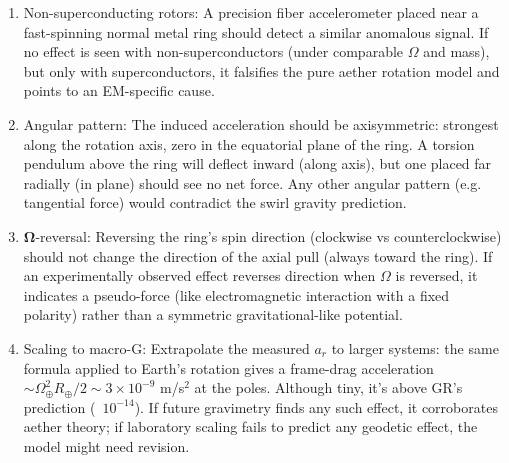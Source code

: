 \documentclass[11pt]{article}
\begin{document}
\begin{enumerate}

\item 
Non-superconducting rotors: A precision fiber accelerometer placed near a fast-spinning normal metal ring should detect a similar anomalous signal. If no effect is seen with non-superconductors (under comparable $\Omega$ and mass), but only with superconductors, it falsifies the pure aether rotation model and points to an EM-specific cause.




\item 
Angular pattern: The induced acceleration should be axisymmetric: strongest along the rotation axis, zero in the equatorial plane of the ring. A torsion pendulum above the ring will deflect inward (along axis), but one placed far radially (in plane) should see no net force. Any other angular pattern (e.g. tangential force) would contradict the swirl gravity prediction.




\item 
$\mathbf{\Omega}$-reversal: Reversing the ring’s spin direction (clockwise vs counterclockwise) should not change the direction of the axial pull (always toward the ring). If an experimentally observed effect reverses direction when $\Omega$ is reversed, it indicates a pseudo-force (like electromagnetic interaction with a fixed polarity) rather than a symmetric gravitational-like potential.




\item 
Scaling to macro-G: Extrapolate the measured $a_r$ to larger systems: the same formula applied to Earth’s rotation gives a frame-drag acceleration $\sim \Omega_{\oplus}^2 R_{\oplus}/2 \sim 3\times10^{-9}$ m/s$^2$ at the poles. Although tiny, it’s above GR’s prediction (~$10^{-14}$). If future gravimetry finds any such effect, it corroborates aether theory; if laboratory scaling fails to predict any geodetic effect, the model might need revision.




\end{enumerate}
\end{document}
